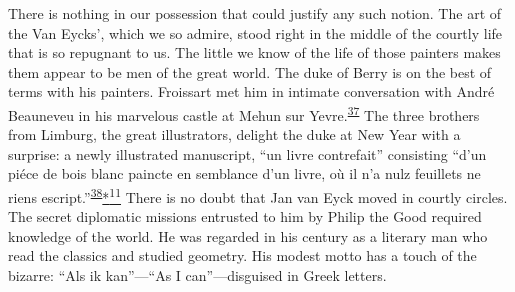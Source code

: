 There is nothing in our possession that could justify any such notion.
The art of the Van Eycks', which we so admire, stood right in the middle
of the courtly life that is so repugnant to us. The little we know of
the life of those painters makes them appear to be men of the great
world. The duke of Berry is on the best of terms with his painters.
Froissart met him in intimate conversation with André Beauneveu in his
marvelous castle at Mehun sur
Yevre.\textsuperscript{\protect\hypertarget{20_ILLUSTRATIONS_FOLLOW_PAGE.xhtmlux5cux23id_399}{\protect\hyperlink{23_NOTES.xhtmlux5cux23id_400}{37}}}
The three brothers from Limburg, the great illustrators, delight the
duke at New Year with a surprise: a newly illustrated manuscript, ``un
livre contrefait'' consisting ``d'un piéce de bois blanc paincte en
semblance d'un livre, où il n'a nulz feuillets ne riens
escript.''\textsuperscript{\protect\hypertarget{20_ILLUSTRATIONS_FOLLOW_PAGE.xhtmlux5cux23id_397}{\protect\hyperlink{23_NOTES.xhtmlux5cux23id_398}{38}}}\protect\hypertarget{20_ILLUSTRATIONS_FOLLOW_PAGE.xhtmlux5cux23id_2349}{\protect\hyperlink{23_NOTES.xhtmlux5cux23id_2350}{*\textsuperscript{11}}}
There is no doubt that Jan van Eyck moved in courtly circles. The secret
diplomatic missions entrusted to him by Philip the Good required
knowledge of the world. He was regarded in his century as a literary man
who read the classics and studied geometry. His modest motto has a touch
of the bizarre: ``Als ik kan''---``As I can''---disguised in Greek
letters.

